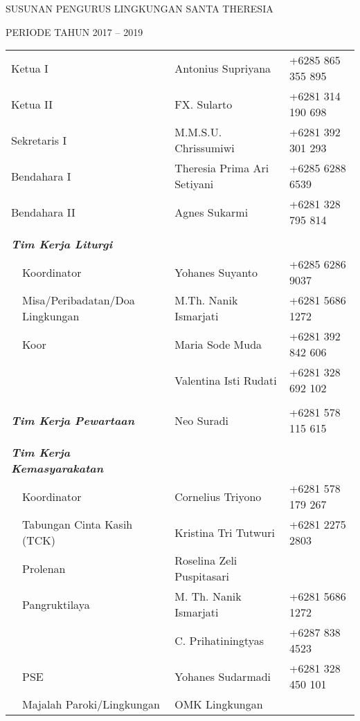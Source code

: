 \begin{center}
	SUSUNAN PENGURUS LINGKUNGAN SANTA THERESIA 
	\par
	PERIODE TAHUN 2017 -- 2019
\end{center}
\begin{longtable}{p{0.5cm}p{4cm}p{5cm}p{4cm}}
	\multicolumn{2}{l}{Ketua I}&Antonius Supriyana &+6285 865 355 895\\
	\multicolumn{2}{l}{Ketua II}&FX. Sularto &+6281 314 190 698\\
	\multicolumn{2}{l}{Sekretaris I}&M.M.S.U. Chrissumiwi &+6281 392 301 293\\
	\multicolumn{2}{l}{Bendahara I}&Theresia Prima Ari Setiyani&+6285 6288 6539\\
	\multicolumn{2}{l}{Bendahara II}&Agnes Sukarmi&+6281 328 795 814\\
	
	\setcounter{nourut}{0}\\
	\multicolumn{2}{l}{\textit{\textbf{Tim Kerja Liturgi}}}&&\\
	&Koordinator&Yohanes Suyanto &+6285 6286 9037\\
	\nexturut&Misa/Peribadatan/Doa Lingkungan &M.Th. Nanik Ismarjati&+6281 5686 1272\\
	\nexturut&Koor&Maria Sode Muda&+6281 392 842 606\\
	&&Valentina Isti Rudati&+6281 328 692 102\\
	
	\setcounter{nourut}{0}\\
	\multicolumn{2}{l}{\textit{\textbf{Tim Kerja Pewartaan}}}&Neo Suradi&+6281 578 115 615\\
	
	\setcounter{nourut}{0}\\
	\multicolumn{2}{l}{\textit{\textbf{Tim Kerja Kemasyarakatan}}}&&\\
	&Koordinator&Cornelius Triyono &+6281 578 179 267\\
	\nexturut&Tabungan Cinta Kasih (TCK)&Kristina Tri Tutwuri &+6281 2275 2803\\
	\nexturut&Prolenan&Roselina Zeli Puspitasari &\\
	\nexturut&Pangruktilaya&M. Th. Nanik Ismarjati&+6281 5686 1272\\
	&&C. Prihatiningtyas&+6287 838 4523\\
	\nexturut&PSE&Yohanes Sudarmadi&+6281 328 450 101\\
	\nexturut&Majalah Paroki/Lingkungan&OMK Lingkungan&\\
	

\end{longtable}
